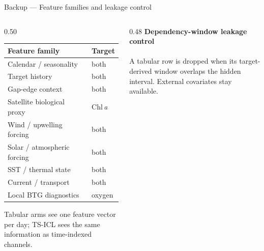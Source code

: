 \documentclass[aspectratio=169,11pt]{beamer}
\newcommand{\chl}{Chl\,\textit{a}}
\begin{document}
\begin{frame}[t]{Backup --- Feature families and leakage control}
  \vskip4pt
  \begin{columns}[T]
    \begin{column}{0.50\textwidth}
      {\footnotesize
      \begin{tabular}{@{}ll@{}}
        \toprule
        Feature family & Target\\
        \midrule
        Calendar / seasonality        & both\\
        Target history                & both\\
        Gap-edge context              & both\\
        Satellite biological proxy    & \chl{}\\
        Wind / upwelling forcing      & both\\
        Solar / atmospheric forcing   & both\\
        SST / thermal state           & both\\
        Current / transport           & both\\
        Local BTG diagnostics         & oxygen\\
        \bottomrule
      \end{tabular}}
      \vskip0.25cm
      {\footnotesize\color{ink}Tabular arms see one feature vector per day; TS-ICL sees the same
       information as time-indexed channels.}
    \end{column}
    \begin{column}{0.48\textwidth}
      \centering
      {\footnotesize\textbf{Dependency-window leakage control}}\\[4pt]
      \resizebox{\linewidth}{!}{}\\[6pt]
      {\footnotesize\color{ink}A tabular row is dropped when its target-derived window overlaps the
       hidden interval. External covariates stay available.}
    \end{column}
  \end{columns}
\end{frame}
\end{document}

